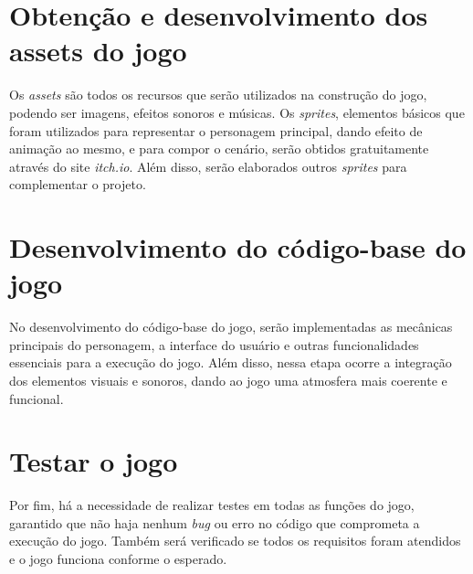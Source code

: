 \section{Obtenção e desenvolvimento dos assets do jogo}

Os \textit{assets} são todos os recursos que serão 	utilizados na construção do jogo, podendo ser imagens, efeitos sonoros e músicas. Os \textit{sprites}, elementos básicos que foram utilizados para representar o personagem principal, dando efeito de animação ao mesmo, e para compor o cenário, serão obtidos gratuitamente através do site \textit{itch.io}. Além disso, serão elaborados outros \textit{sprites} para complementar o projeto.

\section{Desenvolvimento do código-base do jogo}

No desenvolvimento do código-base do jogo, serão implementadas as mecânicas principais do personagem, a interface do usuário e outras funcionalidades essenciais para a execução do jogo. Além disso, nessa etapa ocorre a integração dos elementos visuais e sonoros, dando ao jogo uma atmosfera mais coerente e funcional.

\section{Testar o jogo}

Por fim, há a necessidade de realizar testes em todas as funções do jogo, garantido que não haja nenhum \textit{bug} ou erro no código que comprometa a execução do jogo. Também será verificado se todos os requisitos foram atendidos e o jogo funciona conforme o esperado.